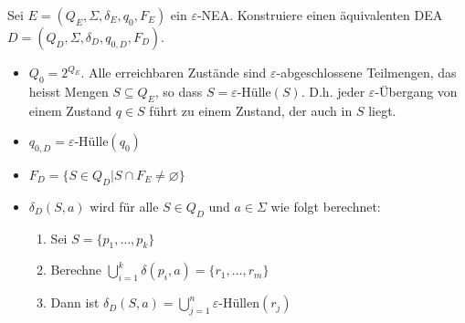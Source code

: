 \documentclass[11pt]{article} %
\theoremstyle{definition}
\begin{document}
Sei $E = (Q_E, \Sigma, \delta_E, q_0, F_E)$ ein $\varepsilon$-NEA. Konstruiere einen äquivalenten DEA $D = (Q_D, \Sigma,
\delta_D, q_{0,D}, F_D)$.
\begin{itemize}
\item $Q_0 = 2^{Q_E}$. Alle erreichbaren Zustände sind $\varepsilon$-abgeschlossene Teilmengen, das heisst Mengen
$S \subseteq Q_E$, so dass $S = \varepsilon$-Hülle$(S)$. D.h. jeder $\varepsilon$-Übergang von einem Zustand $q \in S$ führt
zu einem Zustand, der auch in $S$ liegt.
\item $q_{0,D} = \varepsilon$-Hülle$(q_0)$
\item $F_D = \{ S \in Q_D | S \cap F_E \neq \varnothing \}$
\item $\delta_D(S, a)$ wird für alle $S \in Q_D$ und $a \in \Sigma$ wie folgt berechnet:
\begin{enumerate}
\item Sei $S = \{ p_1, \dots, p_k\}$
\item Berechne $\bigcup\limits_{i=1}^k \delta(p_i, a) = \{r_1, \dots, r_m \}$
\item Dann ist $\delta_D(S, a) = \bigcup\limits_{j=1}^n \varepsilon$-Hüllen$(r_j)$
\end{enumerate}
\end{itemize}
\end{document}
